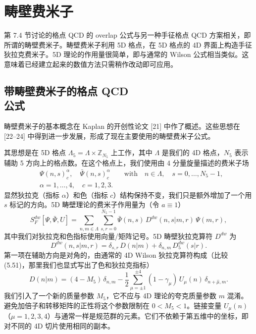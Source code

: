 \section{畴壁费米子}

第 7.4 节讨论的格点 QCD 的 overlap 公式与另一种手征格点 QCD 方案相关，即所谓的畴壁费米子。畴壁费米子利用 5D 格点，在 5D 格点的 4D 界面上构造手征狄拉克费米子。5D 理论的作用量很简单，即与通常的 Wilson 公式相当类似。这意味着已经建立起来的数值方法只需稍作改动即可应用。

\subsection[带畴壁费米子的格点 QCD 公式]{带畴壁费米子的格点 QCD\\ 公式}

畴壁费米子的基本概念在 Kaplan 的开创性论文 [21] 中作了概述。这些思想在 [22--24] 中得到进一步发展，形成了现在主要使用的畴壁费米子公式。

其思想是在 5D 格点 $\Lambda_5 = \Lambda \times \mathbb{Z}_{N_5}$ 上工作，其中 $\Lambda$ 是我们的 4D 格点，$N_5$ 表示辅助 5 方向上的格点数。在这个格点上，我们使用由 4 分量旋量描述的费米子场
\begin{equation}
  \begin{aligned}
    &\Psi(n, s)^{\alpha}_c , \quad \bar\Psi(n, s)^{\alpha}_c
    \qquad \text{with} \quad n \in \Lambda , \quad
    s = 0, \ldots, N_5 - 1 , \\
    &\alpha = 1, \ldots, 4 , \quad c = 1, 2, 3 .
  \end{aligned}
\end{equation}
显然狄拉克（指标 $\alpha$）和色（指标 $c$）结构保持不变，我们只是额外增加了一个用 $s$ 标记的方向。5D 畴壁理论的费米子作用量为（令 $a \equiv 1$）
\begin{equation}
  S_F^{dw}[\Psi, \bar\Psi, U] =
  \sum_{n,m\in\Lambda}\sum_{s,r=0}^{N_5-1}
  \bar\Psi(n, s)\, D^{dw}(n, s|m, r)\, \Psi(m, r) ,
\end{equation}
其中我们对狄拉克和色指标使用向量/矩阵记号。5D 畴壁狄拉克算符 $D^{dw}$ 为
\begin{equation}
  D^{dw}(n, s|m, r) = \delta_{s,r}\, D(n|m) + \delta_{n,m}\, D_5^{dw}(s|r) .
\end{equation}
第一项在辅助方向是对角的，由通常的 4D Wilson 狄拉克算符构成（比较 (5.51)，那里我们也显式写出了色和狄拉克指标）
\begin{equation}
  D(n|m) = (4 - M_5)\,\delta_{n,m} -
  \frac{1}{2}\sum_{\mu=\pm1}^{\pm4}
  (1 - \gamma_\mu)\, U_\mu(n)\, \delta_{n+\hat\mu,m} .
\end{equation}
我们引入了一个新的质量参数 $M_5$，它不应与 4D 理论的夸克质量参数 $m$ 混淆。避免加倍子和转移矩阵的正性将这个参数限制在 $0 < M_5 < 1$。链接变量 $U_\mu(n)$（$\mu = 1, 2, 3, 4$）与通常一样是规范群的元素。它们不依赖于第五维中的坐标，即对不同的 4D 切片使用相同的副本。

